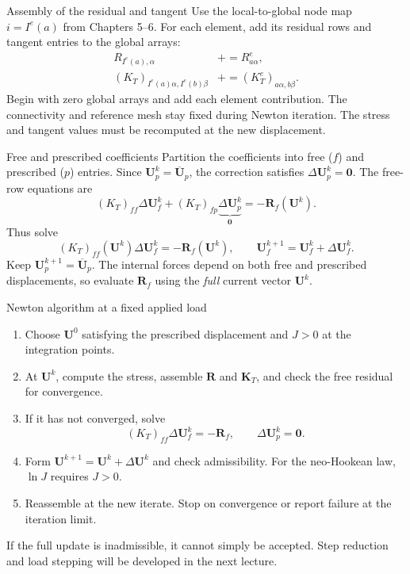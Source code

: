 \documentclass[11pt,aspectratio=169]{beamer}
\newcommand{\bU}{\bm U}
\newcommand{\bR}{\bm R}
\newcommand{\bK}{\bm K}
\begin{document}
\begin{frame}{Assembly of the residual and tangent}
Use the local-to-global node map $i=I^e(a)$ from Chapters 5--6.
For each element, add its residual rows and tangent entries to the global arrays:
\[
\begin{aligned}
R_{I^e(a),\alpha}&\mathrel{+}=R^e_{a\alpha},\\
(K_T)_{I^e(a)\alpha,I^e(b)\beta}
&\mathrel{+}=(K_T^e)_{a\alpha,b\beta}.
\end{aligned}
\]
Begin with zero global arrays and add each element contribution.
The connectivity and reference mesh stay fixed during Newton iteration.
The stress and tangent values must be recomputed at the new displacement.
\end{frame}

\begin{frame}{Free and prescribed coefficients}
Partition the coefficients into free ($f$) and prescribed ($p$) entries.
Since $\bU_p^k=\overline{\bU}_p$, the correction satisfies
$\Delta\bU_p^k=\bm0$.
The free-row equations are
\[
(K_T)_{ff}\Delta\bU_f^k
+(K_T)_{fp}\underbrace{\Delta\bU_p^k}_{\bm0}
=-\bR_f(\bU^k).
\]
Thus solve
\[
\boxed{(K_T)_{ff}(\bU^k)\Delta\bU_f^k=-\bR_f(\bU^k),
\qquad \bU_f^{k+1}=\bU_f^k+\Delta\bU_f^k.}
\]
Keep $\bU_p^{k+1}=\overline{\bU}_p$.
The internal forces depend on both free and prescribed displacements, so
evaluate $\bR_f$ using the \emph{full} current vector $\bU^k$.
\end{frame}

\begin{frame}{Newton algorithm at a fixed applied load}
\begin{enumerate}
\item Choose $\bU^0$ satisfying the prescribed displacement and
$J>0$ at the integration points.
\item At $\bU^k$, compute the stress, assemble $\bR$ and $\bK_T$,
and check the free residual for convergence.
\item If it has not converged, solve
\[
(K_T)_{ff}\Delta\bU_f^k=-\bR_f,
\qquad \Delta\bU_p^k=\bm0.
\]
\item Form $\bU^{k+1}=\bU^k+\Delta\bU^k$ and check admissibility.
For the neo-Hookean law, $\ln J$ requires $J>0$.
\item Reassemble at the new iterate. Stop on convergence or report failure
at the iteration limit.
\end{enumerate}
If the full update is inadmissible, it cannot simply be accepted.
Step reduction and load stepping will be developed in the next lecture.
\end{frame}
\end{document}
